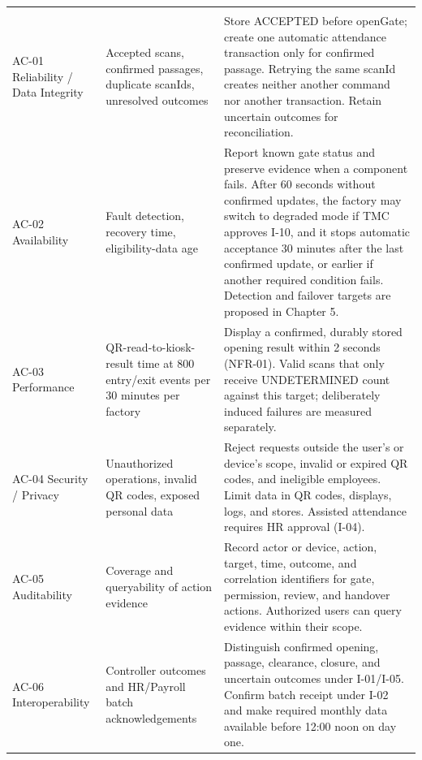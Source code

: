 {\small\renewcommand{\arraystretch}{1.08}
\begin{longtable}{|>{\raggedright\arraybackslash}p{70pt}|>{\raggedright\arraybackslash}p{135pt}|>{\raggedright\arraybackslash}p{213pt}|}
\hline
\multicolumn{1}{|>{\columncolor{tableheader}\centering\arraybackslash}p{70pt}|}{\textbf{Driver}} & \multicolumn{1}{>{\columncolor{tableheader}\centering\arraybackslash}p{135pt}|}{\textbf{Measure}} & \multicolumn{1}{>{\columncolor{tableheader}\centering\arraybackslash}p{213pt}|}{\textbf{Success criterion}} \\
\hline
\endhead
\multicolumn{3}{c}{\rule{0pt}{20pt}\normalsize\textbf{Table 2.3. Success Criteria for the Driving Characteristics}} \\
\endlastfoot
AC-01 Reliability / Data Integrity & Accepted scans, confirmed passages, duplicate scanIds, unresolved outcomes & Store ACCEPTED before openGate; create one automatic attendance transaction only for confirmed passage. Retrying the same scanId creates neither another command nor another transaction. Retain uncertain outcomes for reconciliation. \\
\hline
AC-02 Availability & Fault detection, recovery time, eligibility-data age & Report known gate status and preserve evidence when a component fails. After 60 seconds without confirmed updates, the factory may switch to degraded mode if TMC approves I-10, and it stops automatic acceptance 30 minutes after the last confirmed update, or earlier if another required condition fails. Detection and failover targets are proposed in Chapter 5. \\
\hline
AC-03 Performance & QR-read-to-kiosk-result time at 800 entry/exit events per 30 minutes per factory & Display a confirmed, durably stored opening result within 2 seconds (NFR-01). Valid scans that only receive UNDETERMINED count against this target; deliberately induced failures are measured separately. \\
\hline
AC-04 Security / Privacy & Unauthorized operations, invalid QR codes, exposed personal data & Reject requests outside the user's or device's scope, invalid or expired QR codes, and ineligible employees. Limit data in QR codes, displays, logs, and stores. Assisted attendance requires HR approval (I-04). \\
\hline
AC-05 Auditability & Coverage and queryability of action evidence & Record actor or device, action, target, time, outcome, and correlation identifiers for gate, permission, review, and handover actions. Authorized users can query evidence within their scope. \\*
\hline\noalign{\nobreak}
AC-06 Interoperability & Controller outcomes and HR/Payroll batch acknowledgements & Distinguish confirmed opening, passage, clearance, closure, and uncertain outcomes under I-01/I-05. Confirm batch receipt under I-02 and make required monthly data available before 12:00 noon on day one. \\
\hline
\end{longtable}
}


